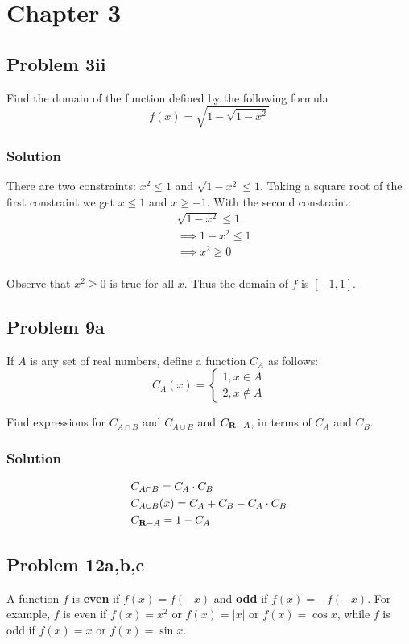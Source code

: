 \section{Chapter 3}
\subsection*{Problem 3ii}
Find the domain of the function defined by the following formula
\[f(x)=\sqrt{1-\sqrt{1-x^2}}\]

\subsubsection*{Solution}
There are two constraints: $x^2\leq1$ and $\sqrt{1-x^2}\leq1$. Taking a square root of the first constraint we get $x\leq1$ and $x\geq-1$. With the second constraint:
\begin{align*}
    &\sqrt{1-x^2}\leq1\\
    &\implies 1-x^2\leq1\\
    &\implies x^2\geq0\\
\end{align*}

Observe that $x^2\geq 0$ is true for all $x$. Thus the domain of $f$ is $[-1,1]$.

\subsection*{Problem 9a}
If $A$ is any set of real numbers, define a function $C_A$ as follows:
\[C_A(x)=\begin{cases}
    1, x\in A\\
    2, x\not\in A
\end{cases}\]

Find expressions for $C_{A\cap B}$ and $C_{A\cup B}$ and $C_{\mathbf{R}-A}$, in terms of $C_A$ and $C_B$. 

\subsubsection*{Solution}
\begin{align*}
    &C_{A\cap B}=C_A\cdot C_B\\
    &C_{A\cup B}(x)=C_A+C_B-C_A\cdot C_B\\
    &C_{\mathbf{R}-A}=1-C_A
\end{align*}

\subsection*{Problem 12a,b,c}
A function $f$ is \textbf{even} if $f(x)=f(-x)$ and \textbf{odd} if $f(x)=-f(-x)$. For example, $f$ is even if $f(x)=x^2$ or $f(x)=|x|$ or $f(x)=\cos x$, while $f$ is odd if $f(x)=x$ or $f(x)=\sin x$.

